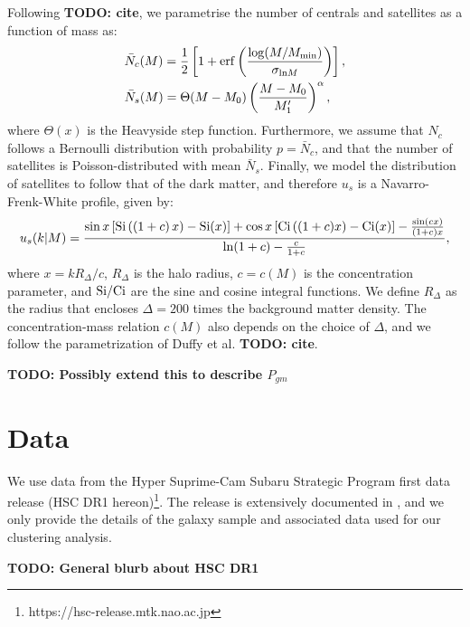 \documentclass[a4paper,11pt]{article}
\newcommand{\todo}[1]{{\bf TODO: #1}}
\begin{document}
    Following \todo{cite}, we parametrise the number of centrals and satellites as a function of mass as:
    \begin{align}
      &\bar{N}_c(M)=\frac{1}{2}\left[1+{\rm erf}\left(\frac{\log(M/M_{\rm min})}{\sigma_{{\rm ln}M}}\right)\right],\\
      &\bar{N}_s(M)=\Theta(M-M_0)\left(\frac{M-M_0}{M_1'}\right)^\alpha,
    \end{align}
    where $\Theta(x)$ is the Heavyside step function. Furthermore, we assume that $N_c$ follows a Bernoulli distribution with probability $p=\bar{N}_c$, and that the number of satellites is Poisson-distributed with mean $\bar{N}_s$. Finally, we model the distribution of satellites to follow that of the dark matter, and therefore $u_s$ is a Navarro-Frenk-White profile, given by:
    \begin{equation}
      u_s(k|M)=\frac{\sin x\left[{\rm Si}\left((1+c)\,x\right)-{\rm Si}(x)\right]+\cos x\left[{\rm Ci}\left((1+c)x\right)-{\rm Ci}(x)\right]-\frac{\sin(cx)}{(1+c)x}}{{\rm ln}(1+c)-\frac{c}{1+c}},
    \end{equation}
    where $x=k R_\Delta/c$, $R_\Delta$ is the halo radius, $c=c(M)$ is the concentration parameter, and ${\rm Si}/{\rm Ci}$ are the sine and cosine integral functions. We define $R_\Delta$ as the radius that encloses $\Delta=200$ times the background matter density. The concentration-mass relation $c(M)$ also depends on the choice of $\Delta$, and we follow the parametrization of Duffy et al. \todo{cite}.

    \todo{Possibly extend this to describe $P_{gm}$}

\section{Data}\label{sec:data}
  We use data from the Hyper Suprime-Cam Subaru Strategic Program first data release (HSC DR1 hereon)\footnote{https://hsc-release.mtk.nao.ac.jp}. The release is extensively documented in \cite{2018PASJ...70S...8A}, and we only provide the details of the galaxy sample and associated data used for our clustering analysis.
  
  \todo{General blurb about HSC DR1}
  
\end{document}
